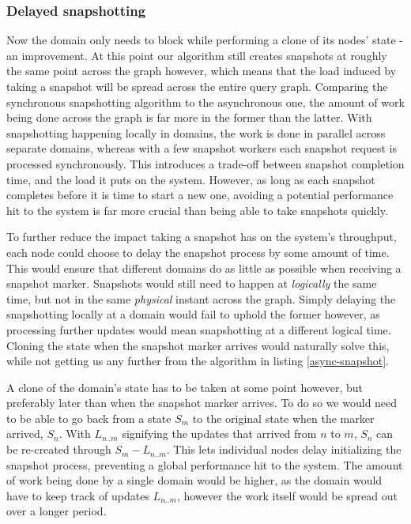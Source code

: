 \documentclass[b5paper]{report}
\begin{document}
\subsubsection{Delayed snapshotting} \label{sec:delay-snapshot}
Now the domain only needs to block while performing a clone of its nodes' state
- an improvement. At this point our algorithm still creates snapshots at roughly
the same point across the graph however, which means that the load induced by
taking a snapshot will be spread across the entire query graph. Comparing the
synchronous snapshotting algorithm to the asynchronous one, the amount of work
being done across the graph is far more in the former than the latter. With
snapshotting happening locally in domains, the work is done in parallel across
separate domains, whereas with a few snapshot workers each snapshot request is
processed synchronously. This introduces a trade-off between snapshot completion
time, and the load it puts on the system. However, as long as each snapshot completes
before it is time to start a new one, avoiding a potential performance hit to
the system is far more crucial than being able to take snapshots quickly.

To further reduce the impact taking a snapshot has on the system's throughput,
each node could choose to delay the snapshot process by some amount of time.
This would ensure that different domains do as little as possible when receiving
a snapshot marker. Snapshots would still need to happen at \textit{logically} the same
time, but not in the same \textit{physical} instant across the graph. Simply
delaying the snapshotting locally at a domain would fail to uphold the former
however, as processing further updates would mean snapshotting at a different
logical time. Cloning the state when the snapshot marker arrives would naturally
solve this, while not getting us any further from the algorithm in listing
\ref{async-snapshot}.

A clone of the domain's state has to be taken at some point however, but
preferably later than when the snapshot marker arrives. To do so we would need
to be able to go back from a state $ S_m $ to the original state when the marker
arrived, $ S_n $. With $ L_{n..m} $ signifying the updates that arrived from $ n
$ to $ m $, $ S_n $ can be re-created through $ S_m - L_{n..m} $. This lets
individual nodes delay initializing the snapshot process, preventing a global
performance hit to the system. The amount of work being done by a single domain
would be higher, as the domain would have to keep track of updates $ L_{n..m} $,
however the work itself would be spread out over a longer period.
\end{document}

